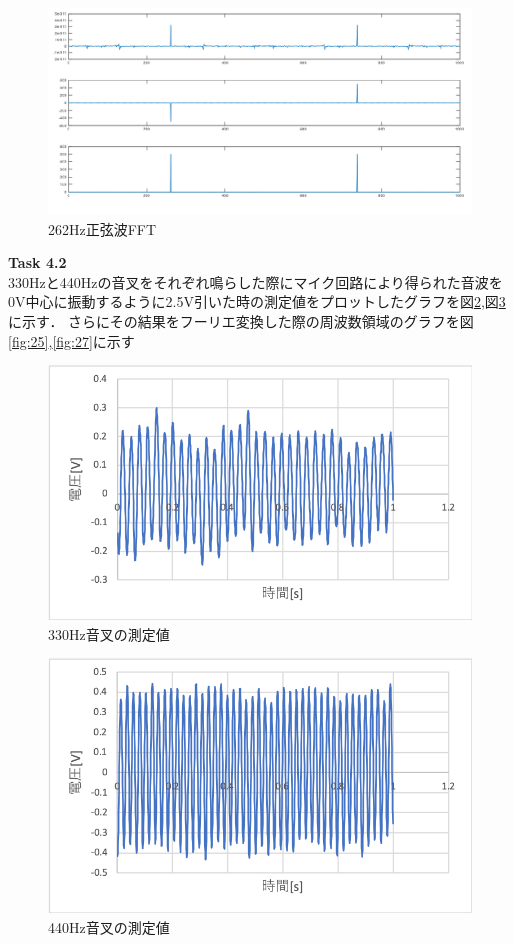 \documentclass[11pt, a4paper,twocolumn]{jarticle}
\begin{document}
\begin{figure}[htbp]
 \begin{center}
  \includegraphics[width=0.8\linewidth]{fig23.png}
 \end{center}
 \caption{262Hz正弦波FFT}
 \label{fig:23}
\end{figure}

\noindent
\textbf{Task 4.2} \\
330Hzと440Hzの音叉をそれぞれ鳴らした際にマイク回路により得られた音波を0V中心に振動するように2.5V引いた時の測定値をプロットしたグラフを図\ref{fig:24},図\ref{fig:26}に示す．
さらにその結果をフーリエ変換した際の周波数領域のグラフを図\ref{fig:25},\ref{fig:27}に示す

\begin{figure}[htbp]
 \begin{center}
  \includegraphics[width=0.8\linewidth]{fig24.png}
 \end{center}
 \caption{330Hz音叉の測定値}
 \label{fig:24}
\end{figure}

\begin{figure}[htbp]
 \begin{center}
  \includegraphics[width=0.8\linewidth]{fig26.png}
 \end{center}
 \caption{440Hz音叉の測定値}
 \label{fig:26}
\end{figure}
\end{document}
